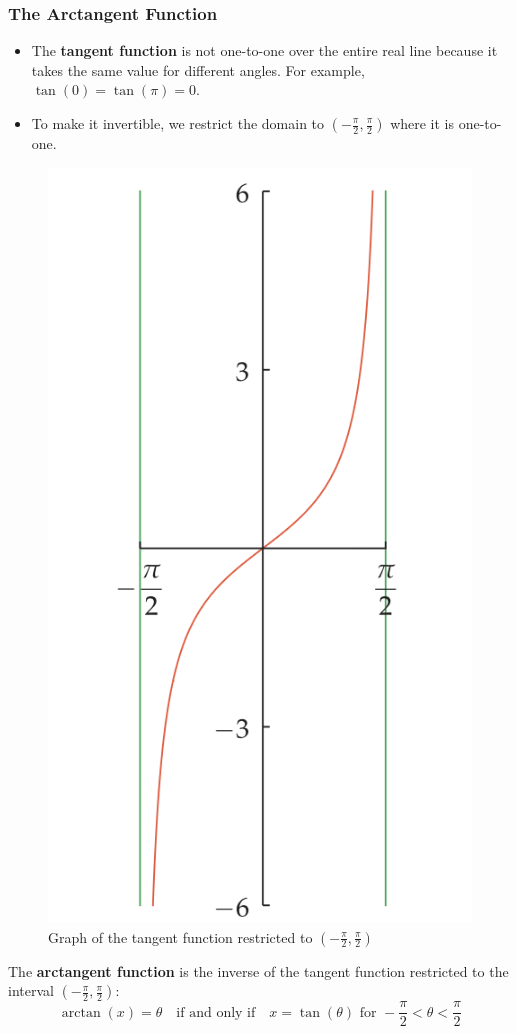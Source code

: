 \subsubsection{The Arctangent Function}
\begin{itemize}
    \item The \textbf{tangent function} is not one-to-one over the entire real line because it takes the same value for different angles. For example, $\tan(0) = \tan(\pi) = 0$.
    \item To make it invertible, we restrict the domain to $(- \frac{\pi}{2}, \frac{\pi}{2})$ where it is one-to-one.
\end{itemize}
\begin{figure}
    \centering
    \includegraphics[scale=0.4]{pics/20.png}
    \caption{Graph of the tangent function restricted to $(- \frac{\pi}{2}, \frac{\pi}{2})$}
\end{figure}
The \textbf{arctangent function} is the inverse of the tangent function restricted to the interval $(- \frac{\pi}{2}, \frac{\pi}{2})$:
\[ \arctan(x) = \theta \quad \text{if and only if} \quad x = \tan(\theta) \text{ for } -\frac{\pi}{2} < \theta < \frac{\pi}{2} \]

